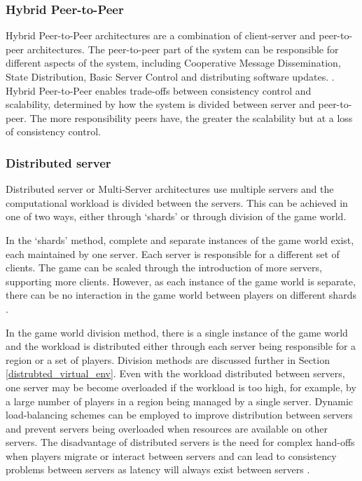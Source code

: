 \subsubsection{Hybrid Peer-to-Peer}
Hybrid Peer-to-Peer architectures are a combination of client-server and peer-to-peer architectures. The peer-to-peer part of the system can be responsible for different aspects of the system, including Cooperative Message Dissemination, State Distribution, Basic Server Control and distributing software updates. \cite{P2PForMMOs}. Hybrid Peer-to-Peer enables trade-offs between consistency control and scalability, determined by how the system is divided between server and peer-to-peer. The more responsibility peers have, the greater the scalability but at a loss of consistency control.

\subsubsection{Distributed server}
Distributed server or Multi-Server architectures use multiple servers and the computational workload is divided between the servers. This can be achieved in one of two ways, either through `shards' or through division of the game world. 

In the `shards' method, complete and separate instances of the game world exist, each maintained by one server. Each server is responsible for a different set of clients. The game can be scaled through the introduction of more servers, supporting more clients. However, as each instance of the game world is separate, there can be no interaction in the game world between players on different shards \cite{P2PForMMOs}.

In the game world division method, there is a single instance of the game world and the workload is distributed either through each server being responsible for a region or a set of players. Division methods are discussed further in Section \ref{distrubted_virtual_env}. Even with the workload distributed between servers, one server may be become overloaded if the workload is too high, for example, by a large number of players in a region being managed by a single server. Dynamic load-balancing schemes can be employed to improve distribution between servers and prevent servers being overloaded when resources are available on other servers. The disadvantage of distributed servers is the need for complex hand-offs when players migrate or interact between servers and can lead to consistency problems between servers as latency will always exist between servers \cite{P2PForMMOs}.


